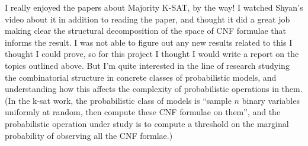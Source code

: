 \documentclass{article}
\begin{document}
I really enjoyed the papers about Majority K-SAT, by the way!
I watched Shyan's video about it in addition to reading the paper, and thought it did a great job making clear the structural decomposition of the space of CNF formulae that informs the result.
I was not able to figure out any new results related to this I thought I could prove, so for this project I thought I would write a report on the topics outlined above.
But I'm quite interested in the line of research studying the combinatorial structure in concrete classes of probabilistic models, and understanding how this affects the complexity of probabilistic operations in them.
(In the k-sat work, the probabilistic class of models is ``sample $n$ binary variables uniformly at random, then compute these CNF formulae on them'', and the probabilistic operation under study is to compute a threshold on the marginal probability of observing all the CNF formlae.)

\printbibliography
\end{document}

